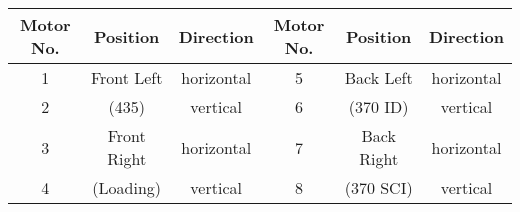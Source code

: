 \documentclass{article}
\begin{document}
\setlength\tabcolsep{8pt}
\renewcommand{\arraystretch}{1.5}
\begin{tabular}{|c|c|c|||c|c|c|}
  \hline
  Motor No.&Position&Direction&Motor No.&Position&Direction\\\hline
  1&Front Left&horizontal&5&Back Left&horizontal\\\cline{1-1}\cline{3-4}\cline{6-6}
  2&(435)&vertical&6&(370 ID)&vertical\\\hline
  3&Front Right&horizontal&7&Back Right&horizontal\\\cline{1-1}\cline{3-4}\cline{6-6}
  4&(Loading)&vertical&8&(370 SCI)&vertical\\\hline
\end{tabular}
\end{document}
